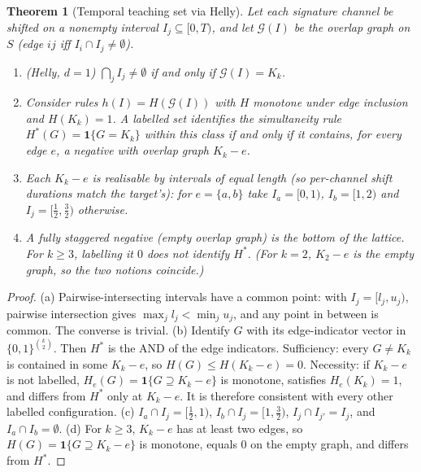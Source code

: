 \documentclass[11pt]{article}
\newtheorem{theorem}{Theorem}[section]
\theoremstyle{definition}
\theoremstyle{remark}
\newcommand{\1}{\mathbf{1}}
\begin{document}
\begin{theorem}[Temporal teaching set via Helly]\label{thm:helly}
Let each signature channel be shifted on a nonempty interval $I_j\subseteq[0,T)$, and let $\mathcal G(I)$ be the overlap graph on $S$ (edge $ij$ iff $I_i\cap I_j\ne\emptyset$).
\begin{enumerate}[label=(\alph*)]
\item (Helly, $d=1$) $\bigcap_jI_j\ne\emptyset$ if and only if $\mathcal G(I)=K_k$.
\item Consider rules $h(I)=H(\mathcal G(I))$ with $H$ monotone under edge inclusion and $H(K_k)=1$. A labelled set identifies the simultaneity rule $H^*(G)=\1\{G=K_k\}$ within this class if and only if it contains, for every edge $e$, a negative with overlap graph $K_k-e$.
\item Each $K_k-e$ is realisable by intervals of equal length (so per-channel shift durations match the target's): for $e=\{a,b\}$ take $I_a=[0,1)$, $I_b=[1,2)$ and $I_j=[\tfrac12,\tfrac32)$ otherwise.
\item A fully staggered negative (empty overlap graph) is the bottom of the lattice. For $k\ge3$, labelling it $0$ does not identify $H^*$. (For $k=2$, $K_2-e$ \emph{is} the empty graph, so the two notions coincide.)
\end{enumerate}
\end{theorem}
\begin{proof}
(a) Pairwise-intersecting intervals have a common point: with $I_j=[l_j,u_j)$, pairwise intersection gives $\max_jl_j<\min_ju_j$, and any point in between is common. The converse is trivial.
(b) Identify $G$ with its edge-indicator vector in $\{0,1\}^{\binom k2}$. Then $H^*$ is the AND of the edge indicators. Sufficiency: every $G\ne K_k$ is contained in some $K_k-e$, so $H(G)\le H(K_k-e)=0$. Necessity: if $K_k-e$ is not labelled, $H_e(G)=\1\{G\supseteq K_k-e\}$ is monotone, satisfies $H_e(K_k)=1$, and differs from $H^*$ only at $K_k-e$. It is therefore consistent with every other labelled configuration.
(c) $I_a\cap I_j=[\tfrac12,1)$, $I_b\cap I_j=[1,\tfrac32)$, $I_j\cap I_{j'}=I_j$, and $I_a\cap I_b=\emptyset$. (d) For $k\ge3$, $K_k-e$ has at least two edges, so $H(G)=\1\{G\supseteq K_k-e\}$ is monotone, equals $0$ on the empty graph, and differs from $H^*$.
\end{proof}
\end{document}
